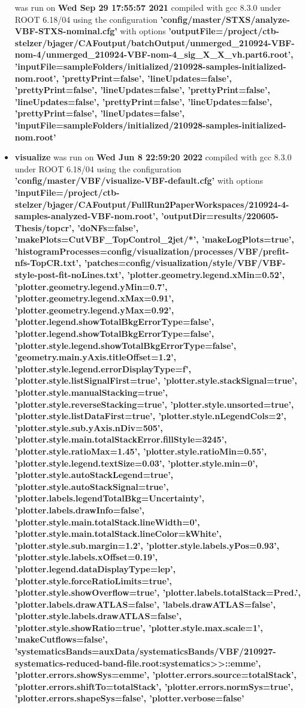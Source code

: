 \documentclass{article}
\begin{document}
\begin{itemize}
was run on \textbf{Wed Sep 29 17:55:57 2021} compiled with gcc 8.3.0 under ROOT 6.18/04 using the configuration \textbf{'config/master/STXS/analyze-VBF-STXS-nominal.cfg'} with options \textbf{'outputFile=/project/ctb-stelzer/bjager/CAFoutput/batchOutput/unmerged\_210924-VBF-nom-4/unmerged\_210924-VBF-nom-4\_sig\_X\_X\_vh.part6.root', 'inputFile=sampleFolders/initialized/210928-samples-initialized-nom.root', 'prettyPrint=false', 'lineUpdates=false', 'prettyPrint=false', 'lineUpdates=false', 'prettyPrint=false', 'lineUpdates=false', 'prettyPrint=false', 'lineUpdates=false', 'prettyPrint=false', 'lineUpdates=false', 'inputFile=sampleFolders/initialized/210928-samples-initialized-nom.root'} \item \textbf{visualize} was run on \textbf{Wed Jun  8 22:59:20 2022} compiled with gcc 8.3.0 under ROOT 6.18/04 using the configuration \textbf{'config/master/VBF/visualize-VBF-default.cfg'} with options \textbf{'inputFile=/project/ctb-stelzer/bjager/CAFoutput/FullRun2PaperWorkspaces/210924-4-samples-analyzed-VBF-nom.root', 'outputDir=results/220605-Thesis/topcr', 'doNFs=false', 'makePlots=CutVBF\_TopControl\_2jet/*', 'makeLogPlots=true', 'histogramProcesses=config/visualization/processes/VBF/prefit-nfs-TopCR.txt', 'patches=config/visualization/style/VBF/VBF-style-post-fit-noLines.txt', 'plotter.geometry.legend.xMin=0.52', 'plotter.geometry.legend.yMin=0.7', 'plotter.geometry.legend.xMax=0.91', 'plotter.geometry.legend.yMax=0.92', 'plotter.legend.showTotalBkgErrorType=false', 'plotter.legend.showTotalBkgErrorType=false', 'plotter.style.legend.showTotalBkgErrorType=false', 'geometry.main.yAxis.titleOffset=1.2', 'plotter.style.legend.errorDisplayType=f', 'plotter.style.listSignalFirst=true', 'plotter.style.stackSignal=true', 'plotter.style.manualStacking=true', 'plotter.style.reverseStacking=true', 'plotter.style.unsorted=true', 'plotter.style.listDataFirst=true', 'plotter.style.nLegendCols=2', 'plotter.style.sub.yAxis.nDiv=505', 'plotter.style.main.totalStackError.fillStyle=3245', 'plotter.style.ratioMax=1.45', 'plotter.style.ratioMin=0.55', 'plotter.style.legend.textSize=0.03', 'plotter.style.min=0', 'plotter.style.autoStackLegend=true', 'plotter.style.autoStackSignal=true', 'plotter.labels.legendTotalBkg=Uncertainty', 'plotter.labels.drawInfo=false', 'plotter.style.main.totalStack.lineWidth=0', 'plotter.style.main.totalStack.lineColor=kWhite', 'plotter.style.sub.margin=1.2', 'plotter.style.labels.yPos=0.93', 'plotter.style.labels.xOffset=0.19', 'plotter.legend.dataDisplayType=lep', 'plotter.style.forceRatioLimits=true', 'plotter.style.showOverflow=true', 'plotter.labels.totalStack=Pred.', 'plotter.labels.drawATLAS=false', 'labels.drawATLAS=false', 'plotter.style.labels.drawATLAS=false', 'plotter.style.showRatio=true', 'plotter.style.max.scale=1', 'makeCutflows=false', 'systematicsBands=auxData/systematicsBands/VBF/210927-systematics-reduced-band-file.root:systematics>>::emme', 'plotter.errors.showSys=emme', 'plotter.errors.source=totalStack', 'plotter.errors.shiftTo=totalStack', 'plotter.errors.normSys=true', 'plotter.errors.shapeSys=false', 'plotter.verbose=false'} \end{itemize}
\end{document}
